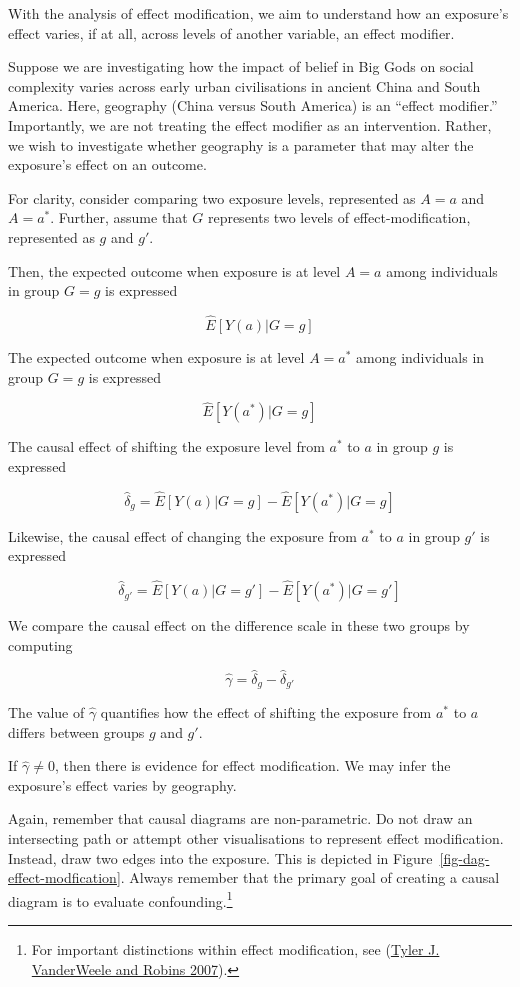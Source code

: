\documentclass[
  singlecolumn]{article}
\begin{document}
With the analysis of effect modification, we aim to understand how an
exposure's effect varies, if at all, across levels of another variable,
an effect modifier.

Suppose we are investigating how the impact of belief in Big Gods on
social complexity varies across early urban civilisations in ancient
China and South America. Here, geography (China versus South America) is
an ``effect modifier.'' Importantly, we are not treating the effect
modifier as an intervention. Rather, we wish to investigate whether
geography is a parameter that may alter the exposure's effect on an
outcome.

For clarity, consider comparing two exposure levels, represented as
\(A = a\) and \(A= a^*\). Further, assume that \(G\) represents two
levels of effect-modification, represented as \(g\) and \(g'\).

Then, the expected outcome when exposure is at level \(A=a\) among
individuals in group \(G=g\) is expressed

\[\hat{E}[Y(a)|G=g]\]

The expected outcome when exposure is at level \(A=a^*\) among
individuals in group \(G=g\) is expressed

\[\hat{E}[Y(a^*)|G=g]\]

The causal effect of shifting the exposure level from \(a^*\) to \(a\)
in group \(g\) is expressed

\[\hat{\delta}_g = \hat{E}[Y(a)|G=g] - \hat{E}[Y(a^*)|G=g]\]

Likewise, the causal effect of changing the exposure from \(a^*\) to
\(a\) in group \(g'\) is expressed

\[\hat{\delta}_{g'} = \hat{E}[Y(a)|G=g'] - \hat{E}[Y(a^*)|G=g']\]

We compare the causal effect on the difference scale in these two groups
by computing

\[\hat{\gamma} = \hat{\delta}_g - \hat{\delta}_{g'}\]

The value of \(\hat{\gamma}\) quantifies how the effect of shifting the
exposure from \(a^*\) to \(a\) differs between groups \(g\) and \(g'\).

If \(\hat{\gamma}\neq 0\), then there is evidence for effect
modification. We may infer the exposure's effect varies by geography.

Again, remember that causal diagrams are non-parametric. Do not draw an
intersecting path or attempt other visualisations to represent effect
modification. Instead, draw two edges into the exposure. This is
depicted in Figure~\ref{fig-dag-effect-modfication}. Always remember
that the primary goal of creating a causal diagram is to evaluate
confounding.\footnote{For important distinctions within effect
  modification, see (\protect\hyperlink{ref-vanderweele2007}{Tyler J.
  VanderWeele and Robins 2007}).}
\end{document}
